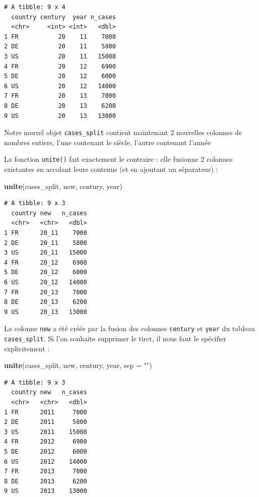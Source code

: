 \documentclass[a4paperpaper,]{article}
\newenvironment{Shaded}{\begin{snugshade}}{\end{snugshade}}
\newcommand{\KeywordTok}[1]{\textcolor[rgb]{0.13,0.29,0.53}{\textbf{#1}}}
\newcommand{\DataTypeTok}[1]{\textcolor[rgb]{0.13,0.29,0.53}{#1}}
\newcommand{\StringTok}[1]{\textcolor[rgb]{0.31,0.60,0.02}{#1}}
\newcommand{\NormalTok}[1]{#1}
\theoremstyle{definition}
\theoremstyle{definition}
\theoremstyle{definition}
\theoremstyle{remark}
\begin{document}
\begin{verbatim}
# A tibble: 9 x 4
  country century  year n_cases
  <chr>     <int> <int>   <dbl>
1 FR           20    11    7000
2 DE           20    11    5800
3 US           20    11   15000
4 FR           20    12    6900
5 DE           20    12    6000
6 US           20    12   14000
7 FR           20    13    7000
8 DE           20    13    6200
9 US           20    13   13000
\end{verbatim}

Notre nouvel objet \texttt{cases\_split} contient maintenant 2 nouvelles
colonnes de nombres entiers, l'une contenant le siècle, l'autre
contenant l'année

La fonction \texttt{unite()} fait exactement le contraire : elle
fusionne 2 colonnes existantes en accolant leurs contenus (et en
ajoutant un séparateur) :

\begin{Shaded}
\begin{Highlighting}[]
\KeywordTok{unite}\NormalTok{(cases_split, new, century, year)}
\end{Highlighting}
\end{Shaded}

\begin{verbatim}
# A tibble: 9 x 3
  country new   n_cases
  <chr>   <chr>   <dbl>
1 FR      20_11    7000
2 DE      20_11    5800
3 US      20_11   15000
4 FR      20_12    6900
5 DE      20_12    6000
6 US      20_12   14000
7 FR      20_13    7000
8 DE      20_13    6200
9 US      20_13   13000
\end{verbatim}

La colonne \texttt{new} a été créée par la fusion des colonnes
\texttt{century} et \texttt{year} du tableau \texttt{cases\_split}. Si
l'on souhaite supprimer le tiret, il nous faut le spécifier
explicitement :

\begin{Shaded}
\begin{Highlighting}[]
\KeywordTok{unite}\NormalTok{(cases_split, new, century, year, }\DataTypeTok{sep =} \StringTok{""}\NormalTok{)}
\end{Highlighting}
\end{Shaded}

\begin{verbatim}
# A tibble: 9 x 3
  country new   n_cases
  <chr>   <chr>   <dbl>
1 FR      2011     7000
2 DE      2011     5800
3 US      2011    15000
4 FR      2012     6900
5 DE      2012     6000
6 US      2012    14000
7 FR      2013     7000
8 DE      2013     6200
9 US      2013    13000
\end{verbatim}
\end{document}

